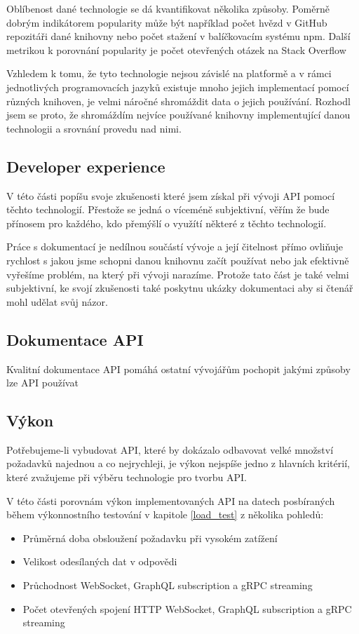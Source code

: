 \documentclass[thesis=M,czech]{FITthesis}[2019/12/23]
\begin{document}
Oblíbenost dané technologie se dá kvantifikovat několika způsoby. Poměrně dobrým indikátorem popularity může být například počet hvězd v GitHub repozitáři dané knihovny nebo počet stažení v balíčkovacím systému npm. Další metrikou k porovnání popularity je počet otevřených otázek na Stack Overflow

Vzhledem k tomu, že tyto technologie nejsou závislé na platformě a v rámci jednotlivých programovacích jazyků existuje mnoho jejich implementací pomocí různých knihoven, je velmi náročné shromáždit data o jejich používání. Rozhodl jsem se proto, že shromáždím nejvíce používané knihovny implementující danou technologii a srovnání provedu nad nimi.

\subsection{Developer experience}
V této části popíšu svoje zkušenosti které jsem získal při vývoji API pomocí těchto technologií. Přestože se jedná o víceméně subjektivní, věřím že bude přínosem pro každého, kdo přemýšlí o využítí některé z těchto technologií.

Práce s dokumentací je nedílnou součástí vývoje a její čitelnost přímo ovliňuje rychlost s jakou jsme schopni danou knihovnu začít používat nebo jak efektivně vyřešíme problém, na který při vývoji narazíme. Protože tato část je také velmi subjektivní, ke svojí zkušenosti také poskytnu ukázky dokumentaci aby si čtenář mohl udělat svůj názor. 

\subsection{Dokumentace API}
Kvalitní dokumentace API pomáhá ostatní vývojářům pochopit jakými způsoby lze API používat

\subsection{Výkon}
Potřebujeme-li vybudovat API, které by dokázalo odbavovat velké množství požadavků najednou a co nejrychleji, je výkon nejspíše jedno z hlavních kritérií, které zvažujeme při výběru technologie pro tvorbu API.

V této části porovnám výkon implementovaných API na datech posbíraných během výkonnostního testování v kapitole \ref{load_test} z několika pohledů:

\begin{itemize}
    \item Průměrná doba obsloužení požadavku při vysokém zatížení
    \item Velikost odesílaných dat v odpovědi
    \item Průchodnost WebSocket, GraphQL subscription a gRPC streaming
    \item Počet otevřených spojení HTTP WebSocket, GraphQL subscription a gRPC streaming
\end{itemize}
\end{document}
